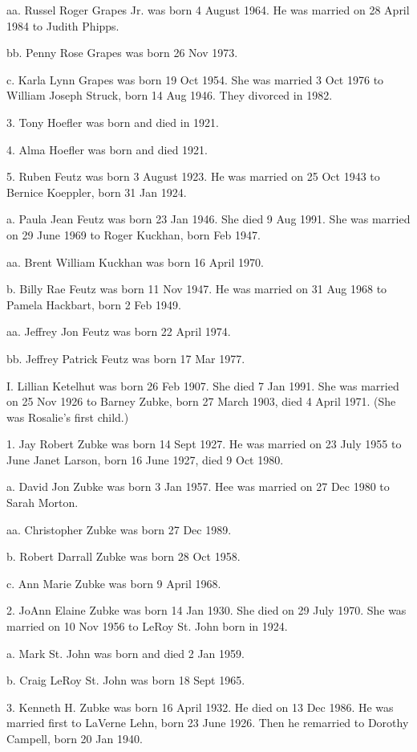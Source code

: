 \documentclass[a4paper]{article}
\begin{document}
aa. Russel Roger Grapes Jr. was born 4 August 1964.  He was married on 28 April 1984 to Judith Phipps.

bb. Penny Rose Grapes was born 26 Nov 1973.

c. Karla Lynn Grapes was born 19 Oct 1954.  She was married 3 Oct 1976 to William Joseph Struck, born 14 Aug 1946.  They divorced in 1982.

3.  Tony Hoefler was born and died in 1921.

4. Alma Hoefler was born and died 1921.

5. Ruben Feutz was born 3 August 1923.  He was married on 25 Oct 1943 to Bernice Koeppler, born 31 Jan 1924.

a. Paula Jean Feutz was born 23 Jan 1946.  She died 9 Aug 1991.  She was married on 29 June 1969 to Roger Kuckhan, born Feb 1947.

aa. Brent William Kuckhan was born 16 April 1970.

b. Billy Rae Feutz  was born 11 Nov 1947.  He was married on 31 Aug 1968 to Pamela Hackbart, born 2 Feb 1949.

aa. Jeffrey Jon Feutz was born 22 April 1974.

bb. Jeffrey Patrick Feutz was born 17 Mar 1977.

I.  Lillian Ketelhut was born 26 Feb 1907.  She died 7 Jan 1991.  She was married on 25 Nov 1926 to Barney Zubke, born 27 March 1903, died 4 April 1971.  (She was Rosalie's first child.)

1. Jay Robert Zubke was born 14 Sept 1927.  He was married on 23 July 1955 to June Janet Larson, born 16 June 1927, died 9 Oct 1980.

a. David Jon Zubke was born 3 Jan 1957.  Hee was married on 27 Dec 1980 to Sarah Morton.

aa. Christopher Zubke was born 27 Dec 1989.

b.  Robert Darrall Zubke was born 28 Oct 1958.  

c. Ann Marie Zubke was born 9 April 1968.

2. JoAnn Elaine Zubke was born 14 Jan 1930.  She died on 29 July 1970.  She was married on 10 Nov 1956 to LeRoy St. John born in 1924.

a. Mark St. John was born and died 2 Jan 1959.

b. Craig LeRoy St. John was born 18 Sept 1965.

3. Kenneth H. Zubke was born 16 April 1932.  He died on 13 Dec 1986.  He was married first to LaVerne Lehn, born 23 June 1926.  Then he remarried to Dorothy Campell, born 20 Jan 1940.  
\end{document}

